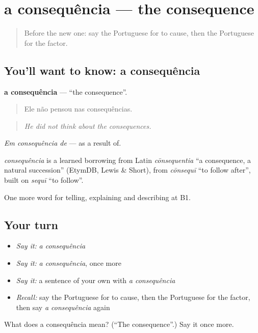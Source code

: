 \section[a consequência]{a consequência — the consequence}

\label{lesson:PT-C348-consequencia}



\begin{quote}
Before the new one: say the Portuguese for to cause, then the Portuguese for the factor.
\end{quote}

\subsection*{You'll want to know: a consequência}
\textbf{a consequência} — \textquotedblleft{}the consequence\textquotedblright{}.

\begin{quote}
Ele não pensou nas consequências.
\end{quote}

\begin{quote}
\emph{He did not think about the consequences.}
\end{quote}

\emph{Em consequência de} — as a result of.

\begin{cousinweb}
\emph{consequência} is a learned borrowing from Latin \emph{cōnsequentia} \textquotedblleft{}a consequence, a natural succession\textquotedblright{} (EtymDB, Lewis \& Short), from \emph{cōnsequī} \textquotedblleft{}to follow after\textquotedblright{}, built on \emph{sequī} \textquotedblleft{}to follow\textquotedblright{}.
\end{cousinweb}

\begin{grammarlens}[title={What you've built}]
One more word for telling, explaining and describing at B1.
\end{grammarlens}

\subsection*{Your turn}
\begin{itemize}
\raggedright
  \item \emph{Say it:} \emph{a consequência}
  \item \emph{Say it:} \emph{a consequência}, once more
  \item \emph{Say it:} a sentence of your own with \emph{a consequência}
  \item \emph{Recall:} say the Portuguese for to cause, then the Portuguese for the factor, then say \emph{a consequência} again
\end{itemize}

\begin{tcolorbox}[breakable,colback=teal!4,colframe=teal!35!black,title={Before you move on}]
What does a consequência mean? (\textquotedblleft{}The consequence\textquotedblright{}.) Say it once more.
\end{tcolorbox}
